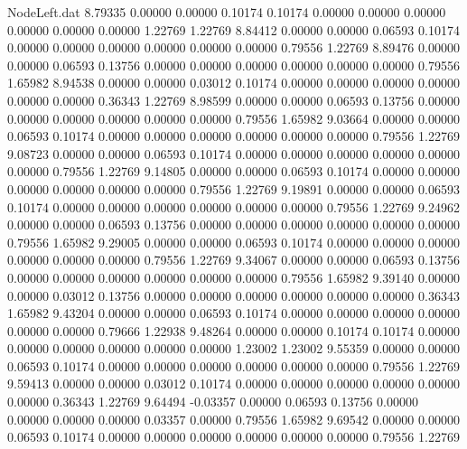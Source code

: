 \begin{filecontents}{NodeLeft.dat}
   8.79335    0.00000    0.00000     0.10174    0.10174    0.00000    0.00000    0.00000    0.00000    0.00000    0.00000    1.22769    1.22769
   8.84412    0.00000    0.00000     0.06593    0.10174    0.00000    0.00000    0.00000    0.00000    0.00000    0.00000    0.79556    1.22769
   8.89476    0.00000    0.00000     0.06593    0.13756    0.00000    0.00000    0.00000    0.00000    0.00000    0.00000    0.79556    1.65982
   8.94538    0.00000    0.00000     0.03012    0.10174    0.00000    0.00000    0.00000    0.00000    0.00000    0.00000    0.36343    1.22769
   8.98599    0.00000    0.00000     0.06593    0.13756    0.00000    0.00000    0.00000    0.00000    0.00000    0.00000    0.79556    1.65982
   9.03664    0.00000    0.00000     0.06593    0.10174    0.00000    0.00000    0.00000    0.00000    0.00000    0.00000    0.79556    1.22769
   9.08723    0.00000    0.00000     0.06593    0.10174    0.00000    0.00000    0.00000    0.00000    0.00000    0.00000    0.79556    1.22769
   9.14805    0.00000    0.00000     0.06593    0.10174    0.00000    0.00000    0.00000    0.00000    0.00000    0.00000    0.79556    1.22769
   9.19891    0.00000    0.00000     0.06593    0.10174    0.00000    0.00000    0.00000    0.00000    0.00000    0.00000    0.79556    1.22769
   9.24962    0.00000    0.00000     0.06593    0.13756    0.00000    0.00000    0.00000    0.00000    0.00000    0.00000    0.79556    1.65982
   9.29005    0.00000    0.00000     0.06593    0.10174    0.00000    0.00000    0.00000    0.00000    0.00000    0.00000    0.79556    1.22769
   9.34067    0.00000    0.00000     0.06593    0.13756    0.00000    0.00000    0.00000    0.00000    0.00000    0.00000    0.79556    1.65982
   9.39140    0.00000    0.00000     0.03012    0.13756    0.00000    0.00000    0.00000    0.00000    0.00000    0.00000    0.36343    1.65982
   9.43204    0.00000    0.00000     0.06593    0.10174    0.00000    0.00000    0.00000    0.00000    0.00000    0.00000    0.79666    1.22938
   9.48264    0.00000    0.00000     0.10174    0.10174    0.00000    0.00000    0.00000    0.00000    0.00000    0.00000    1.23002    1.23002
   9.55359    0.00000    0.00000     0.06593    0.10174    0.00000    0.00000    0.00000    0.00000    0.00000    0.00000    0.79556    1.22769
   9.59413    0.00000    0.00000     0.03012    0.10174    0.00000    0.00000    0.00000    0.00000    0.00000    0.00000    0.36343    1.22769
   9.64494   -0.03357    0.00000     0.06593    0.13756    0.00000    0.00000    0.00000    0.00000    0.03357    0.00000    0.79556    1.65982
   9.69542    0.00000    0.00000     0.06593    0.10174    0.00000    0.00000    0.00000    0.00000    0.00000    0.00000    0.79556    1.22769

\end{filecontents}

